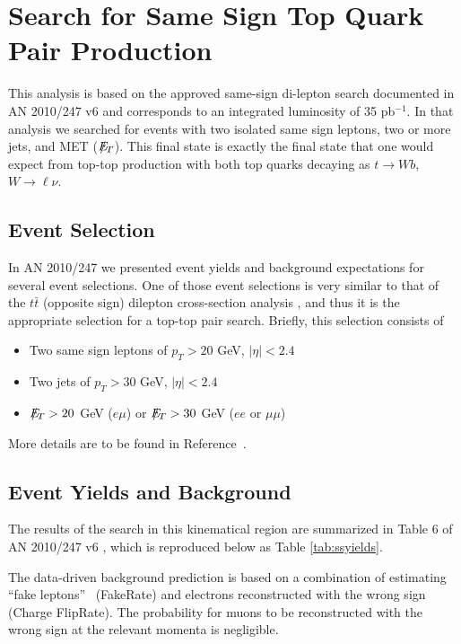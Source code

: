 \section{Search for Same Sign Top Quark Pair Production}
\label{sec:samesign}

This analysis is based on the approved same-sign di-lepton search documented in AN 2010/247 v6 \cite{ssnote1}
and corresponds to an integrated luminosity of 35 pb$^{-1}$.
In that analysis we searched for events with two isolated same sign leptons, two or more jets, and MET ($E\!\!\!\!/_T$).
This final state is exactly the final state that one would expect from top-top production with 
both top quarks decaying as $t\rightarrow Wb$, $W\rightarrow \ell \nu$.



\subsection{Event Selection}

In AN 2010/247 we presented event yields and background expectations for several event selections.  
One of those event selections is very similar to that of the $t\bar{t}$ (opposite sign) dilepton 
cross-section analysis \cite{topxsection}, 
and thus it is the appropriate selection for a top-top pair search.  
Briefly, this selection consists of

\begin{itemize}
	\item Two same sign leptons of $p_T>20$ GeV, $|\eta|<2.4$
	\item Two jets of $p_T>30$ GeV, $|\eta|<2.4$
	\item $E\!\!\!\!/_T >20$ GeV ($e\mu$) or $E\!\!\!\!/_T>30$ GeV ($ee$ or $\mu\mu$)
\end{itemize}

\noindent More details are to be found in Reference~\cite{ssnote1}.

\subsection{Event Yields and Background}
\label{sec:ssyields}

The results of the search in this kinematical region are 
summarized in Table 6 of AN 2010/247 v6 \cite{ssnote1}, 
which is reproduced below as Table \ref{tab:ssyields}.

The data-driven background prediction is based on a combination 
of estimating ``fake leptons''~\cite{fakenote} (FakeRate) 
and electrons reconstructed with the wrong sign~\cite{ssnote1} (Charge FlipRate). 
The probability for muons to be reconstructed with the wrong sign at the 
relevant momenta is negligible.






